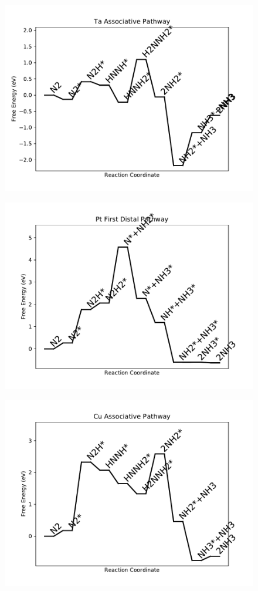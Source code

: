 \begin{figure}
\includegraphics[width=0.8\linewidth]{data/plots/Ta_associative.pdf}
\label{fig:Ta_associative}
\end{figure}

\begin{figure}
\includegraphics[width=0.8\linewidth]{data/plots/Pt_distal_1.pdf}
\label{fig:Pt_distal_1}
\end{figure}

\begin{figure}
\includegraphics[width=0.8\linewidth]{data/plots/Cu_associative.pdf}
\label{fig:Cu_associative}
\end{figure}

